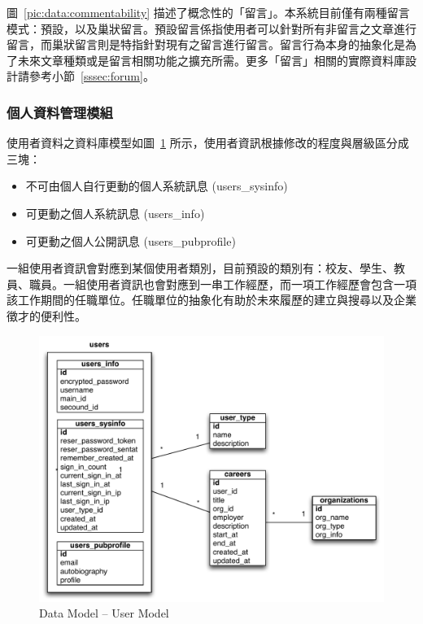 圖~\ref{pic:data:commentability} 描述了概念性的「留言」。本系統目前僅有兩種留言模式：預設，以及巢狀留言。預設留言係指使用者可以針對所有非留言之文章進行留言，而巢狀留言則是特指針對現有之留言進行留言。留言行為本身的抽象化是為了未來文章種類或是留言相關功能之擴充所需。更多「留言」相關的實際資料庫設計請參考小節~\ref{sssec:forum}。

\subsubsection{個人資料管理模組}
\label{sssec:userprofile}
使用者資料之資料庫模型如圖~\ref{pic:data:user} 所示，使用者資訊根據修改的程度與層級區分成三塊：
\begin{itemize}
\item 不可由個人自行更動的個人系統訊息 (users\_sysinfo)
\item 可更動之個人系統訊息 (users\_info)
\item 可更動之個人公開訊息 (users\_pubprofile)
\end{itemize}
一組使用者資訊會對應到某個使用者類別，目前預設的類別有：校友、學生、教員、職員。一組使用者資訊也會對應到一串工作經歷，而一項工作經歷會包含一項該工作期間的任職單位。任職單位的抽象化有助於未來履歷的建立與搜尋以及企業徵才的便利性。

\begin{figure}[h]
\centering
\includegraphics[width=1.05\textwidth]{img/datamodel/user.pdf}
\caption{Data Model -- User Model}
\label{pic:data:user}
\end{figure}

